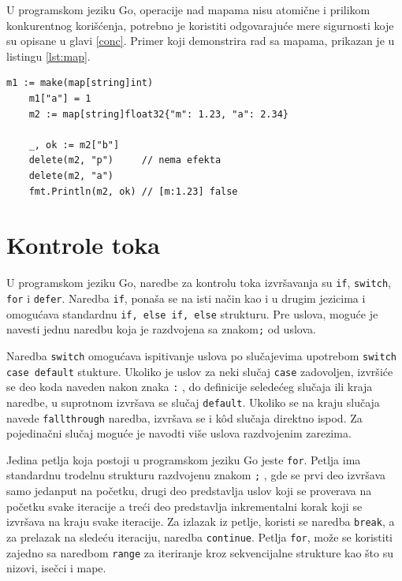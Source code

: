 \documentclass[12pt,oneside]{memoir}
\begin{document}
U programskom jeziku Go, operacije nad mapama nisu atomične i prilikom konkurentnog korišćenja, potrebno je koristiti odgovarajuće mere sigurnosti koje su opisane u glavi \ref{conc}. Primer koji demonstrira rad sa mapama, prikazan je u listingu \ref{lst:map}.

\begin{center}
\begin{lstlisting}[caption=Primer koji demonstrira rad sa mapama, label={lst:map},  backgroundcolor=\color{background}]
	m1 := make(map[string]int)
	m1["a"] = 1
	m2 := map[string]float32{"m": 1.23, "a": 2.34}
	
	_, ok := m2["b"]
	delete(m2, "p")		// nema efekta
	delete(m2, "a")
	fmt.Println(m2, ok) // [m:1.23] false
\end{lstlisting}
\end{center}

\section{Kontrole toka}

U programskom jeziku Go, naredbe za kontrolu toka izvršavanja su \texttt{if}, \texttt{switch}, \texttt{for} i \texttt{defer}. Naredba \texttt{if}, ponaša se na isti način kao i u drugim jezicima i omogućava standardnu \texttt{if, else if, else} strukturu. Pre uslova, moguće je navesti jednu naredbu koja je razdvojena sa znakom\texttt{;} od uslova. 

Naredba \texttt{switch} omogućava ispitivanje uslova po slučajevima upotrebom \texttt{switch case default} stukture. Ukoliko je uslov za neki slučaj \texttt{case} zadovoljen, izvršiće se deo koda naveden nakon znaka \texttt{:} , do definicije seledećeg slučaja ili kraja naredbe, u suprotnom izvršava se slučaj \texttt{default}. Ukoliko se na kraju slučaja navede \texttt{fallthrough} naredba, izvršava se i k\^{o}d slučaja direktno ispod. Za pojedinačni slučaj moguće je navodti više uslova razdvojenim zarezima. 

Jedina petlja koja postoji u programskom jeziku Go jeste \texttt{for}. Petlja ima standardnu trodelnu strukturu razdvojenu znakom \texttt{;} , gde se prvi deo  izvršava samo jedanput na početku, drugi deo predstavlja uslov koji se proverava na početku svake iteracije a treći deo predstavlja inkrementalni korak koji se izvršava na kraju svake iteracije. Za izlazak iz petlje, koristi se naredba \texttt{break}, a za prelazak na sledeću iteraciju, naredba \texttt{continue}. Petlja \texttt{for},  može se koristiti zajedno sa naredbom \texttt{range} za iteriranje kroz sekvencijalne strukture kao što su nizovi, isečci i mape. 
\end{document}
